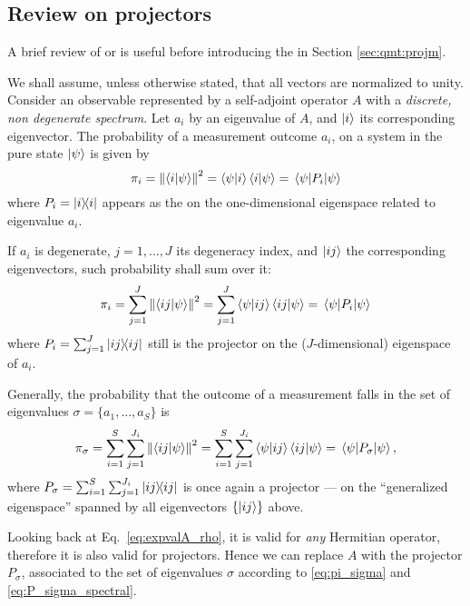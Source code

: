 \subsection{Review on projectors}

A brief review of  or 
is useful before introducing the 
in Section \ref{sec:qmt:projm}.

We shall assume, unless otherwise stated, that all vectors are
normalized to unity.
Consider an observable represented by a self-adjoint operator $A$
with a
\emph{discrete, non degenerate spectrum}.
Let $a_i$ by an eigenvalue of $A$, and $\ket{i}$ its corresponding eigenvector.
The probability of a measurement
outcome $a_i$,
on a system in the pure state $\ket{\psi}$
is given by
$$
\pi_{i} = \norm{\braket{i}{\psi}}^2
        = \bra{\psi}\ket{i}\bra{i}\ket{\psi}
        = \mel{\psi}{P_{i}}{\psi}
$$
where $P_{i} = \ketbra{i}$ appears as the  on the
one-dimensional ei\-gen\-space related to eigenvalue  $a_i$.

If $a_i$ is degenerate, $j = 1, \dots, J$ its degeneracy index, and $\ket{ij}$ the corresponding eigenvectors,
such probability shall sum over it:
$$
\pi_{i} = \sum_{j=1}^{J}\norm{\braket{ij}{\psi}}^2
        = \sum_{j=1}^{J}\bra{\psi}\ket{ij}\bra{ij}\ket{\psi}
        = \mel{\psi}{P_{i}}{\psi}
$$
where $P_{i} = \sum_{j=1}^{J}\ketbra{ij}$
still is the projector on the
($J$-dimensional) eigenspace of $a_i$.

Generally, the probability that the outcome of a measurement falls in
the set of eigenvalues $\sigma = \{a_{1}, \dots, a_{S}\}$ is
\begin{equation}\label{eq:pi_sigma}
\pi_{\sigma}  = \sum_{i=1}^{S}\sum_{j=1}^{J_{i}}\norm{\braket{ij}{\psi}}^2
              = \sum_{i=1}^{S}\sum_{j=1}^{J_{i}}\bra{\psi}\ket{ij}\bra{ij}\ket{\psi}
              = \mel{\psi}{P_{\sigma}}{\psi}
              ,
\end{equation}
where $P_{\sigma} = \sum_{i=1}^{S}\sum_{j=1}^{J_{i}}\ketbra{ij}$
is once again a projector --- on the ``generalized eigenspace'' spanned by all
eigenvectors $\{\ket{ij}\}$ above.

Looking back at Eq.~\eqref{eq:expvalA_rho},
it is valid for \emph{any} Hermitian operator,
therefore it is also valid for projectors.
Hence we can replace $A$ with the projector $P_{\sigma}$,
associated to the set of eigenvalues $\sigma$
according to \eqref{eq:pi_sigma} and \eqref{eq:P_sigma_spectral}.

